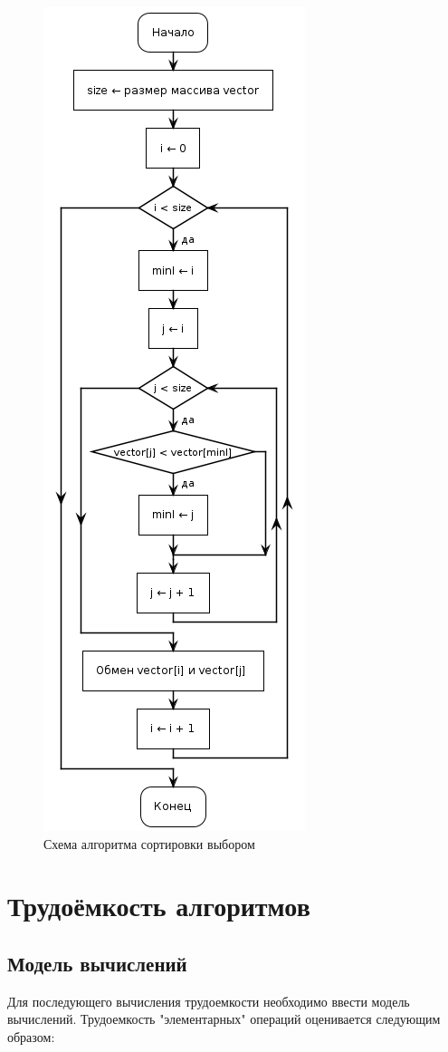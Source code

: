 \begin{figure}[h]
    \centering
    \includegraphics[width=0.3\columnwidth]{plantuml/select.png}
    \caption{Схема алгоритма сортировки выбором}
    \label{fig:scheme_select}
\end{figure} 

\clearpage
\section{Трудоёмкость алгоритмов}

\subsection{Модель вычислений}

Для последующего вычисления трудоемкости необходимо ввести модель вычислений. Трудоемкость "элементарных" операций оценивается следующим образом:

